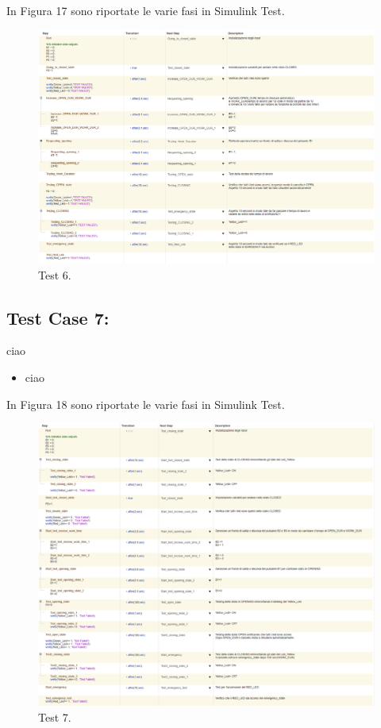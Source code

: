 \documentclass[12pt]{article}
\begin{document}
In Figura 17 sono riportate le varie fasi in Simulink Test.
\begin{figure}[H]
    
    \hspace{-2.3cm} %
    \includegraphics[width=1.3\textwidth]{Immagini_Test/Test_6_img.PNG}
    \caption{Test 6.}
    \label{fig:Test_6}
\end{figure}
\subsection{Test Case 7: }
ciao
\begin{itemize}
    \item ciao
\end{itemize}

In Figura 18 sono riportate le varie fasi in Simulink Test.
\begin{figure}[H]
    
    \hspace{-2.3cm} %
    \includegraphics[width=1.3\textwidth]{Immagini_Test/Test_7_img.PNG}
    \caption{Test 7.}
    \label{fig:Test_7}
\end{figure}
\end{document}
